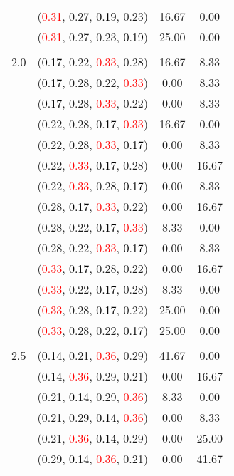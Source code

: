 \documentclass[10pt,a4paper]{report}
\begin{document}
\begin{center}
\begin{longtable}{clcc}
			&(\textcolor{red}{0.31}, 0.27, \textcolor{black}{0.19}, 0.23)&16.67&0.00\\
			&(\textcolor{red}{0.31}, 0.27, 0.23, \textcolor{black}{0.19})&25.00&0.00\\
		&&&\\
		2.0			&(\textcolor{black}{0.17}, 0.22, \textcolor{red}{0.33}, 0.28)&16.67&8.33\\
			&(\textcolor{black}{0.17}, 0.28, 0.22, \textcolor{red}{0.33})&0.00&8.33\\
			&(\textcolor{black}{0.17}, 0.28, \textcolor{red}{0.33}, 0.22)&0.00&8.33\\
			&(0.22, 0.28, \textcolor{black}{0.17}, \textcolor{red}{0.33})&16.67&0.00\\
			&(0.22, 0.28, \textcolor{red}{0.33}, \textcolor{black}{0.17})&0.00&8.33\\
			&(0.22, \textcolor{red}{0.33}, \textcolor{black}{0.17}, 0.28)&0.00&16.67\\
			&(0.22, \textcolor{red}{0.33}, 0.28, \textcolor{black}{0.17})&0.00&8.33\\
			&(0.28, \textcolor{black}{0.17}, \textcolor{red}{0.33}, 0.22)&0.00&16.67\\
			&(0.28, 0.22, \textcolor{black}{0.17}, \textcolor{red}{0.33})&8.33&0.00\\
			&(0.28, 0.22, \textcolor{red}{0.33}, \textcolor{black}{0.17})&0.00&8.33\\
			&(\textcolor{red}{0.33}, \textcolor{black}{0.17}, 0.28, 0.22)&0.00&16.67\\
			&(\textcolor{red}{0.33}, 0.22, \textcolor{black}{0.17}, 0.28)&8.33&0.00\\
			&(\textcolor{red}{0.33}, 0.28, \textcolor{black}{0.17}, 0.22)&25.00&0.00\\
			&(\textcolor{red}{0.33}, 0.28, 0.22, \textcolor{black}{0.17})&25.00&0.00\\
		&&&\\
		2.5			&(\textcolor{black}{0.14}, 0.21, \textcolor{red}{0.36}, 0.29)&41.67&0.00\\
			&(\textcolor{black}{0.14}, \textcolor{red}{0.36}, 0.29, 0.21)&0.00&16.67\\
			&(0.21, \textcolor{black}{0.14}, 0.29, \textcolor{red}{0.36})&8.33&0.00\\
			&(0.21, 0.29, \textcolor{black}{0.14}, \textcolor{red}{0.36})&0.00&8.33\\
			&(0.21, \textcolor{red}{0.36}, \textcolor{black}{0.14}, 0.29)&0.00&25.00\\
			&(0.29, \textcolor{black}{0.14}, \textcolor{red}{0.36}, 0.21)&0.00&41.67\\

\end{longtable}
\end{center}
\end{document}

